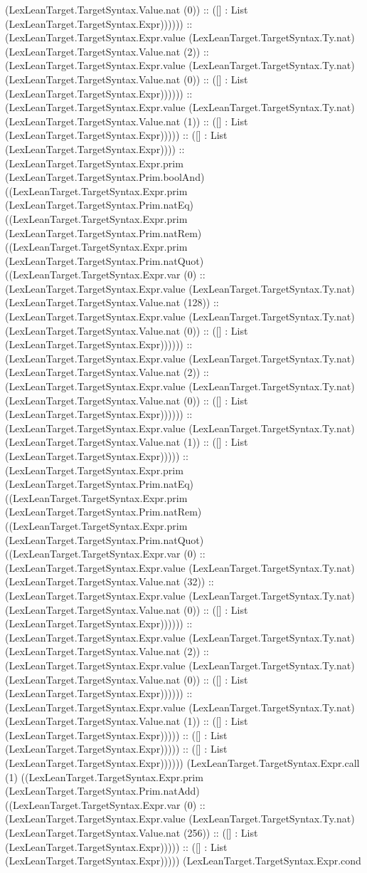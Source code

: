 \documentclass[11pt]{article}
\begin{document}
(LexLeanTarget.TargetSyntax.Value.nat (0)) :: ([] : List (LexLeanTarget.TargetSyntax.Expr)))))) :: (LexLeanTarget.TargetSyntax.Expr.value (LexLeanTarget.TargetSyntax.Ty.nat) (LexLeanTarget.TargetSyntax.Value.nat (2)) :: (LexLeanTarget.TargetSyntax.Expr.value (LexLeanTarget.TargetSyntax.Ty.nat) (LexLeanTarget.TargetSyntax.Value.nat (0)) :: ([] : List (LexLeanTarget.TargetSyntax.Expr)))))) :: (LexLeanTarget.TargetSyntax.Expr.value (LexLeanTarget.TargetSyntax.Ty.nat) (LexLeanTarget.TargetSyntax.Value.nat (1)) :: ([] : List (LexLeanTarget.TargetSyntax.Expr))))) :: ([] : List (LexLeanTarget.TargetSyntax.Expr)))) :: (LexLeanTarget.TargetSyntax.Expr.prim (LexLeanTarget.TargetSyntax.Prim.boolAnd) ((LexLeanTarget.TargetSyntax.Expr.prim (LexLeanTarget.TargetSyntax.Prim.natEq) ((LexLeanTarget.TargetSyntax.Expr.prim (LexLeanTarget.TargetSyntax.Prim.natRem) ((LexLeanTarget.TargetSyntax.Expr.prim (LexLeanTarget.TargetSyntax.Prim.natQuot) ((LexLeanTarget.TargetSyntax.Expr.var (0) :: (LexLeanTarget.TargetSyntax.Expr.value (LexLeanTarget.TargetSyntax.Ty.nat) (LexLeanTarget.TargetSyntax.Value.nat (128)) :: (LexLeanTarget.TargetSyntax.Expr.value (LexLeanTarget.TargetSyntax.Ty.nat) (LexLeanTarget.TargetSyntax.Value.nat (0)) :: ([] : List (LexLeanTarget.TargetSyntax.Expr)))))) :: (LexLeanTarget.TargetSyntax.Expr.value (LexLeanTarget.TargetSyntax.Ty.nat) (LexLeanTarget.TargetSyntax.Value.nat (2)) :: (LexLeanTarget.TargetSyntax.Expr.value (LexLeanTarget.TargetSyntax.Ty.nat) (LexLeanTarget.TargetSyntax.Value.nat (0)) :: ([] : List (LexLeanTarget.TargetSyntax.Expr)))))) :: (LexLeanTarget.TargetSyntax.Expr.value (LexLeanTarget.TargetSyntax.Ty.nat) (LexLeanTarget.TargetSyntax.Value.nat (1)) :: ([] : List (LexLeanTarget.TargetSyntax.Expr))))) :: (LexLeanTarget.TargetSyntax.Expr.prim (LexLeanTarget.TargetSyntax.Prim.natEq) ((LexLeanTarget.TargetSyntax.Expr.prim (LexLeanTarget.TargetSyntax.Prim.natRem) ((LexLeanTarget.TargetSyntax.Expr.prim (LexLeanTarget.TargetSyntax.Prim.natQuot) ((LexLeanTarget.TargetSyntax.Expr.var (0) :: (LexLeanTarget.TargetSyntax.Expr.value (LexLeanTarget.TargetSyntax.Ty.nat) (LexLeanTarget.TargetSyntax.Value.nat (32)) :: (LexLeanTarget.TargetSyntax.Expr.value (LexLeanTarget.TargetSyntax.Ty.nat) (LexLeanTarget.TargetSyntax.Value.nat (0)) :: ([] : List (LexLeanTarget.TargetSyntax.Expr)))))) :: (LexLeanTarget.TargetSyntax.Expr.value (LexLeanTarget.TargetSyntax.Ty.nat) (LexLeanTarget.TargetSyntax.Value.nat (2)) :: (LexLeanTarget.TargetSyntax.Expr.value (LexLeanTarget.TargetSyntax.Ty.nat) (LexLeanTarget.TargetSyntax.Value.nat (0)) :: ([] : List (LexLeanTarget.TargetSyntax.Expr)))))) :: (LexLeanTarget.TargetSyntax.Expr.value (LexLeanTarget.TargetSyntax.Ty.nat) (LexLeanTarget.TargetSyntax.Value.nat (1)) :: ([] : List (LexLeanTarget.TargetSyntax.Expr))))) :: ([] : List (LexLeanTarget.TargetSyntax.Expr))))) :: ([] : List (LexLeanTarget.TargetSyntax.Expr)))))) (LexLeanTarget.TargetSyntax.Expr.call (1) ((LexLeanTarget.TargetSyntax.Expr.prim (LexLeanTarget.TargetSyntax.Prim.natAdd) ((LexLeanTarget.TargetSyntax.Expr.var (0) :: (LexLeanTarget.TargetSyntax.Expr.value (LexLeanTarget.TargetSyntax.Ty.nat) (LexLeanTarget.TargetSyntax.Value.nat (256)) :: ([] : List (LexLeanTarget.TargetSyntax.Expr))))) :: ([] : List (LexLeanTarget.TargetSyntax.Expr))))) (LexLeanTarget.TargetSyntax.Expr.cond 
\end{document}
